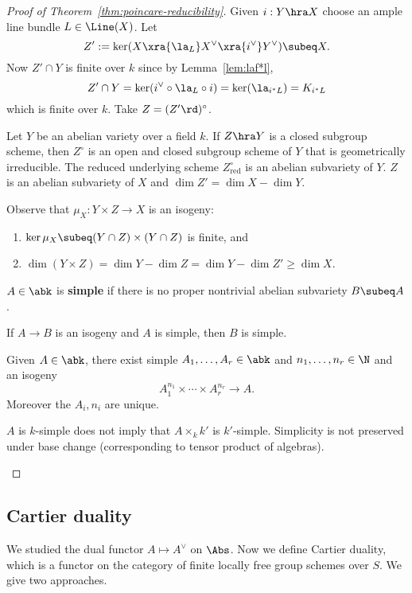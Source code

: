 \begin{proof}[Proof of Theorem~\ref{thm:poincare-reducibility}]
Given $i:Y\hra X$ choose an ample line bundle $L\in \Line(X)$. Let 
\[
Z':=\ker(X\xra{\la_L}X^{\vee} \xra{i^{\vee}} Y^{\vee}) \subeq X.
\]
Now $Z'\cap Y$ is finite over $k$ since by Lemma~\ref{lem:laf*l},
\[
Z'\cap Y%
=\ker (i^{\vee}\circ \la_L\circ i)=\ker(\la_{i^*L})=K_{i^*L}
\]
which is finite over $k$.  %
Take $Z=(Z'\rd)^{\circ}$. 
\begin{fct}\cite[5.31]{GGBM}
Let $Y$ be an abelian variety over a field $k$. If $Z\hra Y$ is a closed subgroup scheme, then $Z^{\circ}$ is an open and closed subgroup scheme of $Y$ that is geometrically irreducible. The reduced underlying scheme $Z^{\circ}_{\text{red}}$ is an abelian subvariety of $Y$. 
$Z$ is an abelian subvariety of $X$ and $\dim Z'=\dim X-\dim Y$.
\end{fct}
Observe that  $\mu_X:Y\times Z\to X$ is an isogeny:
\begin{enumerate}
\item $\ker \mu_X\subeq (Y\cap Z)\times (Y\cap Z)$ is finite, and 
\item $\dim(Y\times Z)=\dim Y-\dim Z=\dim Y-\dim Z'\ge \dim X$.
\end{enumerate}
\begin{df}
$A\in \abk$ is \textbf{simple} if there is no proper nontrivial abelian subvariety $B\subeq A$.
\end{df}
\begin{pr}
 If $A\to B$ is an isogeny and $A$ is simple, then $B$ is simple. 
\end{pr}
\begin{cor}
Given $A\in \abk$, there exist simple $A_1,\ldots, A_r\in \abk$ and $n_1,\ldots, n_r\in \N$ and an isogeny
\[
A_1^{n_1}\times \cdots \times A_r^{n_r}\to A.
\]
Moreover the $A_i,n_i$ are unique.
\end{cor}
\begin{rem}
$A$ is $k$-simple does not imply that $A\times_k k'$ is $k'$-simple. Simplicity is not preserved under base change (corresponding to tensor product of algebras).
\end{rem}
\end{proof}
\subsection{Cartier duality}
We studied the dual functor $A\mapsto A^{\vee}$ on $\Abs$. Now we define Cartier duality, which is a functor on the category of finite locally free group schemes over $S$. We give two approaches.
